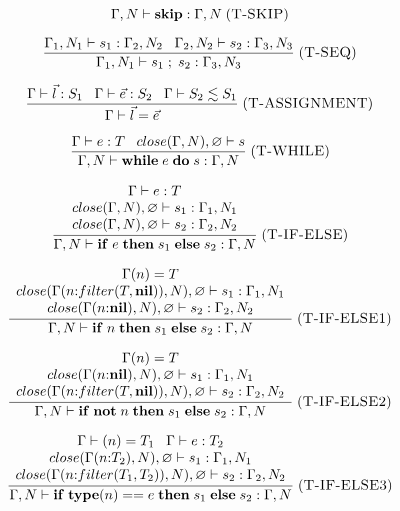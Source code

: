 \[
\Gamma, N \vdash \mathbf{skip} : \Gamma, N
\; (\textsc{T-SKIP})
\]

\[
\frac{\Gamma_{1}, N_{1} \vdash s_{1} : \Gamma_{2}, N_{2} \;\;\;
      \Gamma_{2}, N_{2} \vdash s_{2} : \Gamma_{3}, N_{3}}
     {\Gamma_{1}, N_{1} \vdash s_{1} \;;\; s_{2} : \Gamma_{3}, N_{3} }
\; (\textsc{T-SEQ})
\]

\[
\frac{\Gamma \vdash \vec{l}:S_{1} \;\;\;
      \Gamma \vdash \vec{e}:S_{2} \;\;\;
      \Gamma \vdash S_{2} \lesssim S_{1}}
     {\Gamma \vdash \vec{l} = \vec{e}}
\; (\textsc{T-ASSIGNMENT})
\]

\[
\frac{\Gamma \vdash e:T \;\;\;
      close(\Gamma, N), \varnothing \vdash s}
     {\Gamma, N \vdash \mathbf{while} \; e \; \mathbf{do} \; s : \Gamma, N}
\; (\textsc{T-WHILE})
\]

\[
\frac{\begin{array}{c}
      \Gamma \vdash e:T\\
      close(\Gamma, N), \varnothing \vdash s_{1} : \Gamma_{1}, N_{1}\\
      close(\Gamma, N), \varnothing \vdash s_{2} : \Gamma_{2}, N_{2}
      \end{array}}
     {\Gamma, N \vdash \mathbf{if} \; e \; \mathbf{then} \; s_{1} \; \mathbf{else} \; s_{2} : \Gamma, N}
\; (\textsc{T-IF-ELSE})
\]

\[
\frac{\begin{array}{c}
      \Gamma(n) = T\\
      close(\Gamma(n{:}filter(T, \mathbf{nil})), N), \varnothing \vdash s_{1} : \Gamma_{1}, N_{1}\\
      close(\Gamma(n{:}\mathbf{nil}), N), \varnothing \vdash s_{2} : \Gamma_{2}, N_{2}
      \end{array}}
     {\Gamma, N \vdash \mathbf{if} \; n \; \mathbf{then} \; s_{1} \; \mathbf{else} \; s_{2} : \Gamma, N}
\; (\textsc{T-IF-ELSE1})
\]

\[
\frac{\begin{array}{c}
      \Gamma(n) = T\\
      close(\Gamma(n{:}\mathbf{nil}), N), \varnothing \vdash s_{1} : \Gamma_{1}, N_{1}\\
      close(\Gamma(n{:}filter(T, \mathbf{nil})), N), \varnothing \vdash s_{2} : \Gamma_{2}, N_{2}
      \end{array}}
     {\Gamma, N \vdash \mathbf{if} \; \mathbf{not} \; n \; \mathbf{then} \; s_{1} \; \mathbf{else} \; s_{2} : \Gamma, N}
\; (\textsc{T-IF-ELSE2})
\]

\[
\frac{\begin{array}{c}
      \Gamma \vdash(n) = T_{1} \;\;\; \Gamma \vdash e:T_{2}\\
      close(\Gamma(n{:}T_{2}), N), \varnothing \vdash s_{1} : \Gamma_{1}, N_{1}\\
      close(\Gamma(n{:}filter(T_{1}, T_{2})), N), \varnothing \vdash s_{2} : \Gamma_{2}, N_{2}
      \end{array}}
     {\Gamma, N \vdash \mathbf{if} \; \mathbf{type}(n) == e \; \mathbf{then} \; s_{1} \; \mathbf{else} \; s_{2} : \Gamma, N}
\; (\textsc{T-IF-ELSE3})
\]

